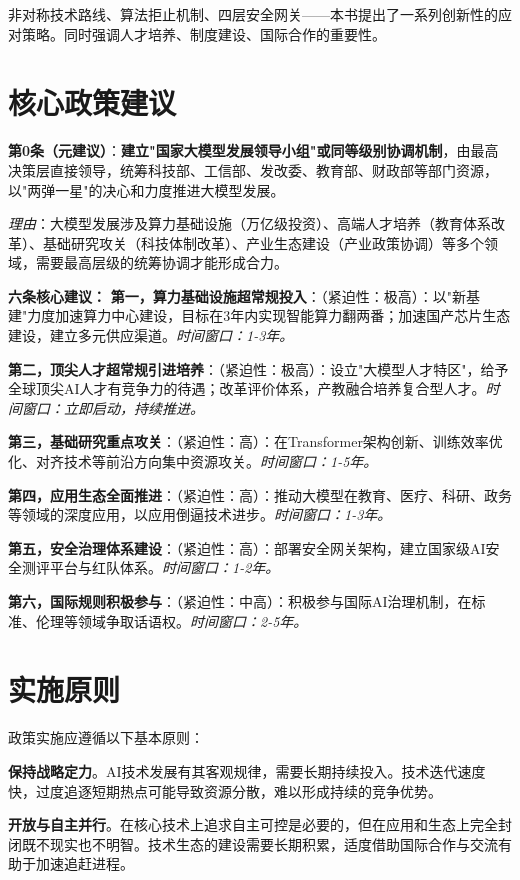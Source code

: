 非对称技术路线、算法拒止机制、四层安全网关——本书提出了一系列创新性的应对策略。同时强调人才培养、制度建设、国际合作的重要性。

\section{核心政策建议}

\textbf{第0条（元建议）}：\textbf{建立"国家大模型发展领导小组"或同等级别协调机制}，由最高决策层直接领导，统筹科技部、工信部、发改委、教育部、财政部等部门资源，以"两弹一星"的决心和力度推进大模型发展。

\textit{理由}：大模型发展涉及算力基础设施（万亿级投资）、高端人才培养（教育体系改革）、基础研究攻关（科技体制改革）、产业生态建设（产业政策协调）等多个领域，需要最高层级的统筹协调才能形成合力。

\textbf{六条核心建议：}
\textbf{第一，算力基础设施超常规投入}：（紧迫性：极高）：以"新基建"力度加速算力中心建设，目标在3年内实现智能算力翻两番；加速国产芯片生态建设，建立多元供应渠道。\textit{时间窗口：1-3年。}

\textbf{第二，顶尖人才超常规引进培养}：（紧迫性：极高）：设立"大模型人才特区"，给予全球顶尖AI人才有竞争力的待遇；改革评价体系，产教融合培养复合型人才。\textit{时间窗口：立即启动，持续推进。}

\textbf{第三，基础研究重点攻关}：（紧迫性：高）：在Transformer架构创新、训练效率优化、对齐技术等前沿方向集中资源攻关。\textit{时间窗口：1-5年。}

\textbf{第四，应用生态全面推进}：（紧迫性：高）：推动大模型在教育、医疗、科研、政务等领域的深度应用，以应用倒逼技术进步。\textit{时间窗口：1-3年。}

\textbf{第五，安全治理体系建设}：（紧迫性：高）：部署安全网关架构，建立国家级AI安全测评平台与红队体系。\textit{时间窗口：1-2年。}

\textbf{第六，国际规则积极参与}：（紧迫性：中高）：积极参与国际AI治理机制，在标准、伦理等领域争取话语权。\textit{时间窗口：2-5年。}

\section{实施原则}

政策实施应遵循以下基本原则：

\textbf{保持战略定力}。AI技术发展有其客观规律，需要长期持续投入。技术迭代速度快，过度追逐短期热点可能导致资源分散，难以形成持续的竞争优势。

\textbf{开放与自主并行}。在核心技术上追求自主可控是必要的，但在应用和生态上完全封闭既不现实也不明智。技术生态的建设需要长期积累，适度借助国际合作与交流有助于加速追赶进程。

